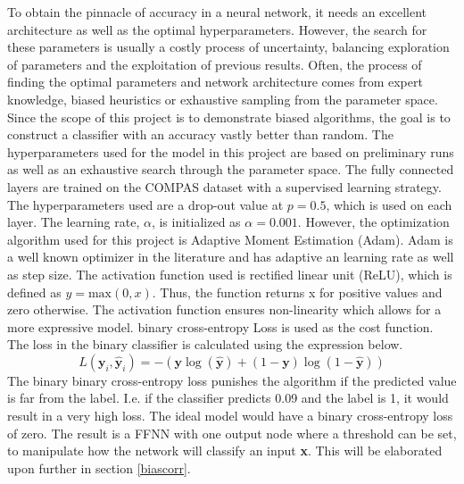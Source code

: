 \documentclass[11pt, fleqn, titlepage]{article}
\begin{document}
	\noindent 
	To obtain the pinnacle of accuracy in a neural network, it needs an excellent architecture as well as the optimal hyperparameters. However, the search for these parameters is usually a costly process of uncertainty, balancing exploration of parameters and the exploitation of previous results. Often, the process of finding the optimal parameters and network architecture comes from expert knowledge, biased heuristics or exhaustive sampling from the parameter space. Since the scope of this project is to demonstrate biased algorithms, the goal is to construct a classifier with an accuracy vastly better than random. The hyperparameters used for the model in this project are based on preliminary runs as well as an exhaustive search through the parameter space. The fully connected layers are trained on the COMPAS dataset with a supervised learning strategy. The hyperparameters used are a drop-out value at $p=0.5$, which is used on each layer. The learning rate, $\alpha$, is initialized as $\alpha = 0.001$. However, the optimization algorithm used for this project is Adaptive Moment Estimation (Adam). Adam is a well known optimizer in the literature and has adaptive an learning rate as well as step size. The activation function used is rectified linear unit (ReLU), which is defined as $ y = \text{max}(0,x) $. Thus, the function returns x for positive values and zero otherwise. The activation function ensures non-linearity which allows for a more expressive model. binary cross-entropy Loss is used as the cost function. The loss in the binary classifier is calculated using the expression below. 
	\begin{equation}\label{key}
	L\left(\boldsymbol{y}_{i}, \hat{\boldsymbol{y}}_{i}\right) = -(\mathbf y \log (\mathbf {\hat y})+(1-\mathbf  y) \log (1-\mathbf {\hat y}))
	\end{equation}
	The binary binary cross-entropy loss punishes the algorithm if the predicted value is far from the label. I.e. if the classifier predicts 0.09 and the label is 1, it would result in a very high loss. The ideal model would have a binary cross-entropy loss of zero. \cite {dl} The result is a FFNN with one output node where a threshold can be set, to manipulate how the network will classify an input \textbf{x}. This will be elaborated upon further in section \ref{biascorr}.

	
\end{document}
